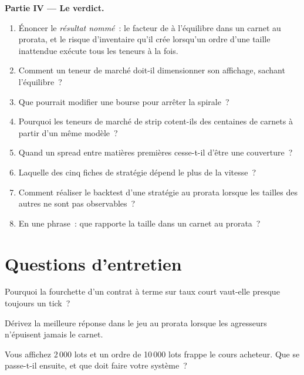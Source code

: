 \begin{problem}
\medskip\noindent\textbf{Partie IV --- Le verdict.}
\begin{enumerate}[resume]
\item Énoncer le \emph{résultat nommé}~: le facteur de  à l'équilibre dans un carnet au prorata, et le risque d'inventaire qu'il crée lorsqu'un ordre
d'une taille inattendue exécute tous les teneurs à la fois.
\item Comment un teneur de marché doit-il dimensionner son affichage, sachant l'équilibre~?
\item Que pourrait modifier une bourse pour arrêter la spirale~?
\item Pourquoi les teneurs de marché de strip cotent-ils des centaines de carnets à partir d'un même modèle~?
\item Quand un spread entre matières premières cesse-t-il d'être une couverture~?
\item Laquelle des cinq fiches de stratégie dépend le plus de la vitesse~?
\item Comment réaliser le backtest d'une stratégie au prorata lorsque les tailles des autres ne sont pas observables~?
\item En une phrase~: que rapporte la taille dans un carnet au prorata~?
\end{enumerate}
\end{problem}

\section{Questions d'entretien}

\begin{interviewq}\label{iq:hf:futures-market-making:1}
Pourquoi la fourchette d'un contrat à terme sur taux court vaut-elle presque toujours un tick~?
\end{interviewq}

\begin{interviewq}\label{iq:hf:futures-market-making:2}
Dérivez la meilleure réponse dans le jeu au prorata lorsque les agresseurs n'épuisent jamais le carnet.
\end{interviewq}

\begin{interviewq}\label{iq:hf:futures-market-making:3}
Vous affichez 2\,000 lots et un ordre de 10\,000 lots frappe le cours acheteur. Que se passe-t-il ensuite, et que doit faire votre système~?
\end{interviewq}

